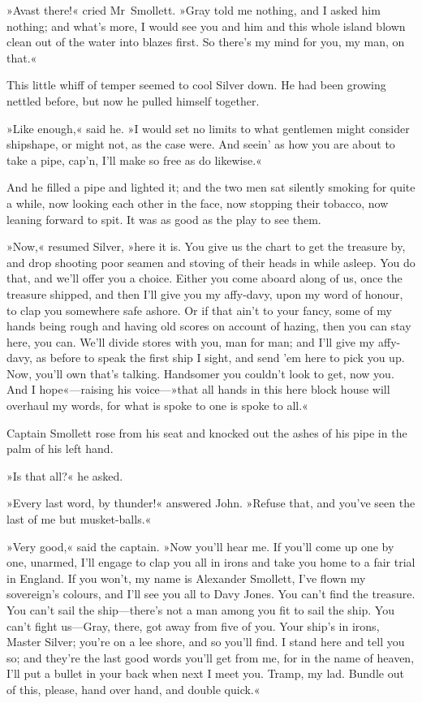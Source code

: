»Avast there!« cried Mr~Smollett. »Gray told me nothing, and I asked him nothing; and what's more, I would see you and him and this whole island blown clean out of the water into blazes first. So there's my mind for you, my man, on that.«

This little whiff of temper seemed to cool Silver down. He had been growing nettled before, but now he pulled himself together.

»Like enough,« said he. »I would set no limits to what gentlemen might consider shipshape, or might not, as the case were. And seein' as how you are about to take a pipe, cap'n, I'll make so free as do likewise.«

And he filled a pipe and lighted it; and the two men sat silently smoking for quite a while, now looking each other in the face, now stopping their tobacco, now leaning forward to spit. It was as good as the play to see them.

»Now,« resumed Silver, »here it is. You give us the chart to get the treasure by, and drop shooting poor seamen and stoving of their heads in while asleep. You do that, and we'll offer you a choice. Either you come aboard along of us, once the treasure shipped, and then I'll give you my affy-davy, upon my word of honour, to clap you somewhere safe ashore. Or if that ain't to your fancy, some of my hands being rough and having old scores on account of hazing, then you can stay here, you can. We'll divide stores with you, man for man; and I'll give my affy-davy, as before to speak the first ship I sight, and send 'em here to pick you up. Now, you'll own that's talking. Handsomer you couldn't look to get, now you. And I hope«—raising his voice—»that all hands in this here block house will overhaul my words, for what is spoke to one is spoke to all.«

Captain Smollett rose from his seat and knocked out the ashes of his pipe in the palm of his left hand.

»Is that all?« he asked.

»Every last word, by thunder!« answered John. »Refuse that, and you've seen the last of me but musket-balls.«

»Very good,« said the captain. »Now you'll hear me. If you'll come up one by one, unarmed, I'll engage to clap you all in irons and take you home to a fair trial in England. If you won't, my name is Alexander Smollett, I've flown my sovereign's colours, and I'll see you all to Davy Jones. You can't find the treasure. You can't sail the ship—there's not a man among you fit to sail the ship. You can't fight us—Gray, there, got away from five of you. Your ship's in irons, Master Silver; you're on a lee shore, and so you'll find. I stand here and tell you so; and they're the last good words you'll get from me, for in the name of heaven, I'll put a bullet in your back when next I meet you. Tramp, my lad. Bundle out of this, please, hand over hand, and double quick.«

